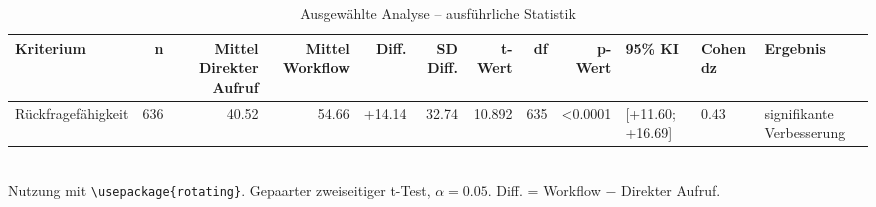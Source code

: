 \begin{table}
\centering
\caption{Ausgewählte Analyse -- ausführliche Statistik}
\begin{tabular}{lrrrrrrrrlll}
\toprule
Kriterium & n & Mittel Direkter Aufruf & Mittel Workflow & Diff. & SD Diff. & t-Wert & df & p-Wert & 95\% KI & Cohen dz & Ergebnis \\
\midrule
Rückfragefähigkeit & 636 & 40.52 & 54.66 & +14.14 & 32.74 & 10.892 & 635 & <0.0001 & [+11.60; +16.69] & 0.43 & signifikante Verbesserung \\
\bottomrule
\end{tabular}
\\[2mm]
\footnotesize Nutzung mit \texttt{\textbackslash usepackage\{rotating\}}. Gepaarter zweiseitiger t-Test, $\alpha=0.05$. Diff. = Workflow $-$ Direkter Aufruf.
\end{table}
